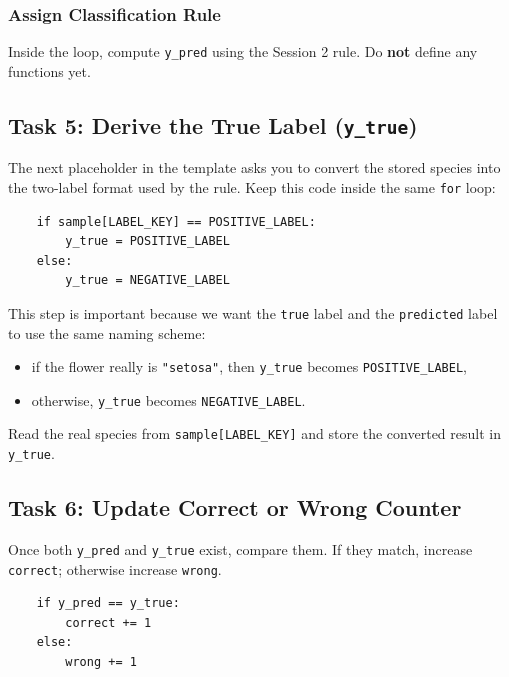 \subsubsection{Assign Classification Rule}
\label{sec:ses3_required_bridge}
Inside the loop, compute \texttt{y\_pred} using the Session 2 rule. Do \textbf{not} define any functions yet.

\subsection{Task 5: Derive the True Label (\texttt{y\_true})}
The next placeholder in the template asks you to convert the stored species into the two-label format used by the rule. Keep this code inside the same \texttt{for} loop:
\begin{verbatim}
    if sample[LABEL_KEY] == POSITIVE_LABEL:
        y_true = POSITIVE_LABEL
    else:
        y_true = NEGATIVE_LABEL
\end{verbatim}

This step is important because we want the \texttt{true} label and the \texttt{predicted} label to use the same naming scheme:
\begin{itemize}
    \item if the flower really is \texttt{"setosa"}, then \texttt{y\_true} becomes \texttt{POSITIVE\_LABEL},
    \item otherwise, \texttt{y\_true} becomes \texttt{NEGATIVE\_LABEL}.
\end{itemize}

\begin{tcolorbox}[title=Task 5:. Derive true label (y\_true) from the dataset sample]
Read the real species from \texttt{sample[LABEL\_KEY]} and store the converted result in \texttt{y\_true}.
\end{tcolorbox}

\subsection{Task 6: Update Correct or Wrong Counter}
Once both \texttt{y\_pred} and \texttt{y\_true} exist, compare them. If they match, increase \texttt{correct}; otherwise increase \texttt{wrong}.
\begin{verbatim}
    if y_pred == y_true:
        correct += 1
    else:
        wrong += 1
\end{verbatim}

